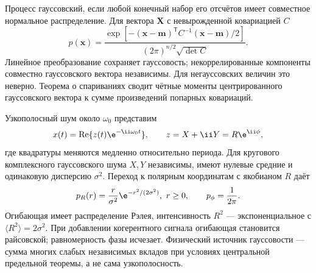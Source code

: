 
Процесс гауссовский, если любой конечный набор его отсчётов имеет совместное нормальное распределение. Для вектора $\bm X$ с невырожденной ковариацией $C$
\begin{equation}
 p(\bm x)=\frac{\exp[-(\bm x-\bm m)^{\mathsf T}C^{-1}(\bm x-\bm m)/2]}
 {(2\pi)^{n/2}\sqrt{\det C}}.
\end{equation}
Линейное преобразование сохраняет гауссовость; некоррелированные компоненты совместно гауссовского вектора независимы. Для негауссовских величин это неверно. Теорема о спариваниях сводит чётные моменты центрированного гауссовского вектора к сумме произведений попарных ковариаций.

Узкополосный шум около $\omega_0$ представим
\begin{equation}
 x(t)=\operatorname{Re}\{z(t)\e^{-\ii\omega_0t}\},\qquad z=X+\ii Y=R\e^{\ii\phi},
\end{equation}
где квадратуры меняются медленно относительно периода. Для кругового комплексного гауссовского шума $X,Y$ независимы, имеют нулевые средние и одинаковую дисперсию $\sigma^2$. Переход к полярным координатам с якобианом $R$ даёт
\begin{equation}
 p_R(r)=\frac r{\sigma^2}\e^{-r^2/(2\sigma^2)},\ r\geq0,
 \qquad p_\phi=\frac1{2\pi}.
\end{equation}
Огибающая имеет распределение Рэлея, интенсивность $R^2$ — экспоненциальное с $\langle R^2\rangle=2\sigma^2$. При добавлении когерентного сигнала огибающая становится райсовской; равномерность фазы исчезает. Физический источник гауссовости — сумма многих слабых независимых вкладов при условиях центральной предельной теоремы, а не сама узкополосность.

